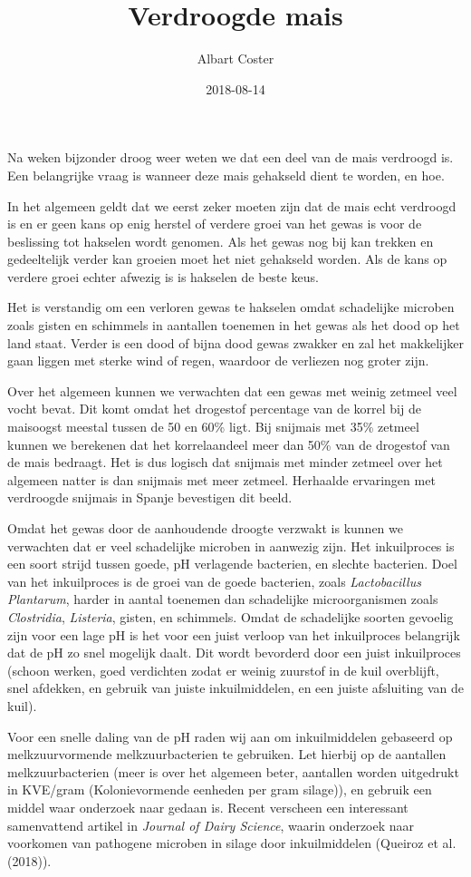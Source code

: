 \documentclass[]{article}
\title{Verdroogde mais}
\author{Albart Coster}
\date{2018-08-14}
\begin{document}
\maketitle

Na weken bijzonder droog weer weten we dat een deel van de mais
verdroogd is. Een belangrijke vraag is wanneer deze mais gehakseld dient
te worden, en hoe.

In het algemeen geldt dat we eerst zeker moeten zijn dat de mais echt
verdroogd is en er geen kans op enig herstel of verdere groei van het
gewas is voor de beslissing tot hakselen wordt genomen. Als het gewas
nog bij kan trekken en gedeeltelijk verder kan groeien moet het niet
gehakseld worden. Als de kans op verdere groei echter afwezig is is
hakselen de beste keus.

Het is verstandig om een verloren gewas te hakselen omdat schadelijke
microben zoals gisten en schimmels in aantallen toenemen in het gewas
als het dood op het land staat. Verder is een dood of bijna dood gewas
zwakker en zal het makkelijker gaan liggen met sterke wind of regen,
waardoor de verliezen nog groter zijn.

Over het algemeen kunnen we verwachten dat een gewas met weinig zetmeel
veel vocht bevat. Dit komt omdat het drogestof percentage van de korrel
bij de maisoogst meestal tussen de 50 en 60\% ligt. Bij snijmais met
35\% zetmeel kunnen we berekenen dat het korrelaandeel meer dan 50\% van
de drogestof van de mais bedraagt. Het is dus logisch dat snijmais met
minder zetmeel over het algemeen natter is dan snijmais met meer
zetmeel. Herhaalde ervaringen met verdroogde snijmais in Spanje
bevestigen dit beeld.

Omdat het gewas door de aanhoudende droogte verzwakt is kunnen we
verwachten dat er veel schadelijke microben in aanwezig zijn. Het
inkuilproces is een soort strijd tussen goede, pH verlagende bacterien,
en slechte bacterien. Doel van het inkuilproces is de groei van de goede
bacterien, zoals \emph{Lactobacillus Plantarum}, harder in aantal
toenemen dan schadelijke microorganismen zoals \emph{Clostridia},
\emph{Listeria}, gisten, en schimmels. Omdat de schadelijke soorten
gevoelig zijn voor een lage pH is het voor een juist verloop van het
inkuilproces belangrijk dat de pH zo snel mogelijk daalt. Dit wordt
bevorderd door een juist inkuilproces (schoon werken, goed verdichten
zodat er weinig zuurstof in de kuil overblijft, snel afdekken, en
gebruik van juiste inkuilmiddelen, en een juiste afsluiting van de
kuil).

Voor een snelle daling van de pH raden wij aan om inkuilmiddelen
gebaseerd op melkzuurvormende melkzuurbacterien te gebruiken. Let
hierbij op de aantallen melkzuurbacterien (meer is over het algemeen
beter, aantallen worden uitgedrukt in KVE/gram (Kolonievormende eenheden
per gram silage)), en gebruik een middel waar onderzoek naar gedaan is.
Recent verscheen een interessant samenvattend artikel in \emph{Journal
of Dairy Science}, waarin onderzoek naar voorkomen van pathogene
microben in silage door inkuilmiddelen (Queiroz et al. (2018)).
\end{document}
